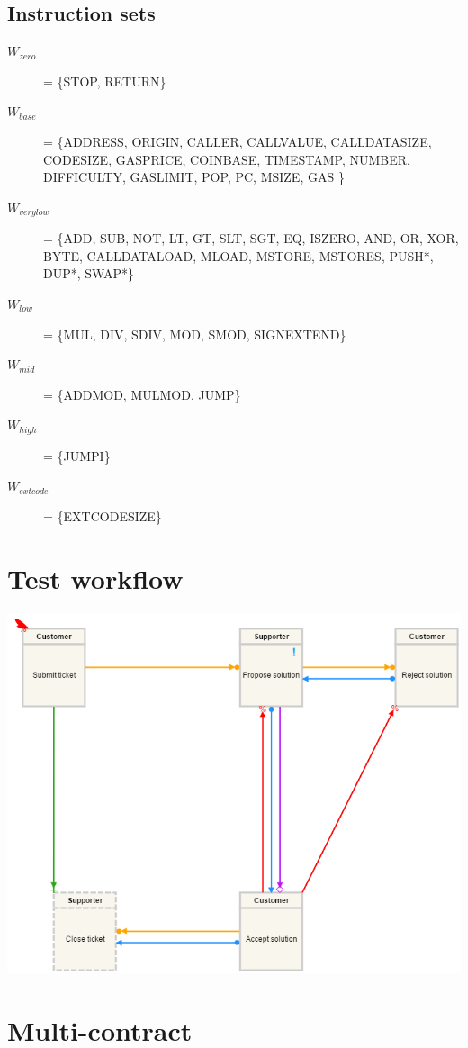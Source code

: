 \documentclass{article}
\begin{document}
		\subsection{Instruction sets}
		\begin{description}
			\item[$W_{zero}$] = \{STOP, RETURN\}
			\item[$W_{base}$] = \{ADDRESS, ORIGIN, CALLER, CALLVALUE, CALLDATASIZE, CODESIZE, GASPRICE, COINBASE, TIMESTAMP, NUMBER, DIFFICULTY, GASLIMIT, POP, PC, MSIZE, GAS \}
			\item[$W_{verylow}$] = \{ADD, SUB, NOT, LT, GT, SLT, SGT, EQ, ISZERO, AND, OR, XOR, BYTE, CALLDATALOAD, MLOAD, MSTORE, MSTORES, PUSH*, DUP*, SWAP*\}
			\item[$W_{low}$] = \{MUL, DIV, SDIV, MOD, SMOD, SIGNEXTEND\}
			\item[$W_{mid}$] = \{ADDMOD, MULMOD, JUMP\}
			\item[$W_{high}$] = \{JUMPI\}
			\item[$W_{extcode}$] = \{EXTCODESIZE\}			
		\end{description}

	\section{Test workflow}

		\includegraphics[scale=0.45]{figures/ExampleWorkflow.png}

	\section{Multi-contract}
\end{document}
